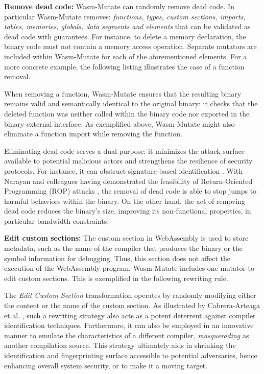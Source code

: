 \documentclass[a4paper,fleqn]{cas-dc}
\newcommand{\tool}{{\sc Wasm-Mutate}\xspace}
\begin{document}
\textbf{Remove dead code:} \tool can randomly remove dead code.
In particular \tool removes: \emph{functions, types, custom sections, imports, tables, memories, globals, data segments and elements} that can be validated as dead code with guarantees.
For instance, to delete a memory declaration, the binary code must not contain a memory access operation. 
Separate mutators are included within \tool for each of the aforementioned elements.
For a more concrete example, the following listing illustrates the case of a function removal.



When removing a function, \tool ensures that the resulting binary remains valid and semantically identical to the original binary: it checks  that the deleted function was neither called within the binary code nor exported in the binary external interface. 
As exemplified above, \tool might also eliminate a function import while removing the function. 

Eliminating dead code serves a dual purpose: it minimizes the attack surface available to potential malicious actors \cite{236200} and strengthens the resilience of security protocols. 
For instance, it can obstruct signature-based identification \cite{CABRERAARTEAGA2023103296}.
With Narayan and colleagues having demonstrated the feasibility of Return-Oriented Programming (ROP) attacks \cite{Swivel}, the removal of dead code is able to stop jumps to harmful behaviors within the binary. 
On the other hand, the act of removing dead code  reduces the binary's size, improving its non-functional properties, in particular bandwidth constraints. 


\textbf{Edit custom sections:}
The custom section in WebAssembly is used to store metadata, such as the name of the compiler that produces the binary or the symbol information for debugging.
Thus, this section does not affect the execution of the WebAssembly program.
\tool includes one mutator to edit custom sections. 
This is exemplified in the following rewriting rule. 



The \emph{Edit Custom Section} transformation operates by randomly modifying either the content or the name of the custom section. 
As illustrated by Cabrera-Arteaga et al. \cite{CABRERAARTEAGA2023103296}, such a rewriting strategy also acts as a potent deterrent against compiler identification techniques.
Furthermore, it can also be employed in an innovative manner to emulate the characteristics of a different compiler, \emph{masquerading} as another compilation source. 
This strategy ultimately aids in shrinking the identification and fingerprinting surface accessible to potential adversaries, hence enhancing overall system security, or to make it a moving target.
\end{document}
